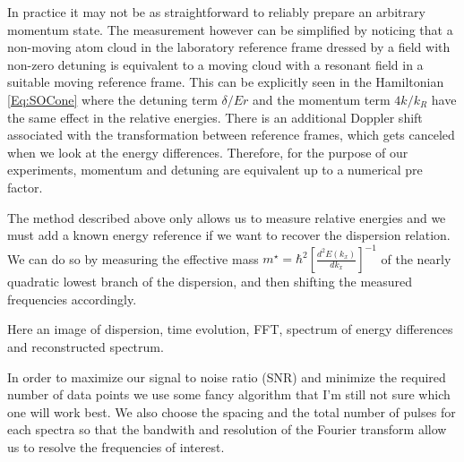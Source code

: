 In practice it may not be as straightforward to reliably prepare an arbitrary momentum state. The measurement however can be simplified by noticing that a non-moving atom cloud in the laboratory reference frame dressed by a field with non-zero detuning is equivalent to a moving cloud with a resonant field in a suitable moving reference frame. This can be explicitly seen in the Hamiltonian \ref{Eq:SOCone} where the detuning term $\delta/Er$  and the momentum term $4 k/k_R$ have the same effect in the relative energies. There is an additional Doppler shift associated with the transformation between reference frames, which gets canceled when we look at the energy differences. Therefore, for the purpose of our experiments, momentum and detuning are equivalent up to a numerical pre factor. 

The method described above only allows us to measure relative energies and we must add a known energy reference if we want to recover the dispersion relation. We can do so by measuring the effective mass $m^{\star} = \hbar^2[\frac{d^2E(k_x)}{dk_x}]^{-1}$ of the nearly quadratic lowest branch of the dispersion, and then shifting the measured frequencies accordingly. 

 Here an image of dispersion, time evolution, FFT, spectrum of energy differences and reconstructed spectrum.

In order to maximize our signal to noise ratio (SNR) and minimize the required number of data points we use some fancy algorithm that I'm still not sure which one will work best. We also choose the spacing and the total number of pulses for each spectra so that the bandwith and resolution of the Fourier transform allow us to resolve the frequencies of interest. 





